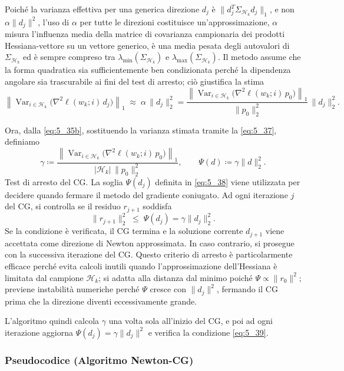 \documentclass[a4paper,12pt]{article}
\numberwithin{equation}{section}
\numberwithin{figure}{section}
\numberwithin{table}{section}
\begin{document}
Poiché la varianza effettiva per una generica direzione $d_j$ è $\|d_j^T \Sigma_{\mathcal{H}_k} d_j\|_1$, e non $\alpha\|d_j\|^2$, l'uso di $\alpha$ per tutte le direzioni costituisce un'approssimazione, $\alpha$ misura l'influenza media della matrice di covarianza campionaria dei prodotti Hessiana-vettore su un vettore generico, è una media pesata degli autovalori di $\Sigma_{\mathcal{H}_k}$ ed è sempre compreso tra $\lambda_{\min}(\Sigma_{\mathcal{H}_k})$ e $\lambda_{\max}(\Sigma_{\mathcal{H}_k})$. Il metodo assume che la forma quadratica sia sufficientemente ben condizionata perché la dipendenza angolare sia trascurabile ai fini del test di arresto; ciò giustifica la stima
\[\left\| \operatorname{Var}_{i\in\mathcal{H}_k}\bigl(\nabla^2\ell(w_k;i)\,d_j\bigr) \right\|_1
\;\approx\;
\alpha \, \|d_j\|_2^2
=
\frac{\left\| \operatorname{Var}_{i\in\mathcal{H}_k}\bigl(\nabla^2\ell(w_k;i)\,p_0\bigr) \right\|_1}{\|p_0\|_2^2} \, \|d_j\|_2^2.
\tag{5.37}\label{eq:5_37}
\]

Ora, dalla \eqref{eq:5_35b}, sostituendo la varianza stimata tramite la \eqref{eq:5_37}, definiamo
\[
\gamma \coloneqq
\frac{\left\| \operatorname{Var}_{i\in\mathcal{H}_k}\bigl(\nabla^2\ell(w_k;i)\,p_0\bigr) \right\|_1}{|\mathcal{H}_k| \, \|p_0\|_2^2},
\qquad
\Psi(d) \coloneqq \gamma \|d\|_2^2.
\tag{5.38}\label{eq:5_38}
\]
\medskip
\noindent
Test di arresto del CG.
La soglia $\Psi(d_j)$ definita in \eqref{eq:5_38} viene utilizzata per decidere quando fermare il metodo del gradiente coniugato. Ad ogni iterazione $j$ del CG, si controlla se il residuo $r_{j+1}$ soddisfa
\[
\| r_{j+1} \|_2^2 \;\le\; \Psi(d_j) = \gamma \|d_j\|_2^2.
\tag{5.39}\label{eq:5_39}
\]
Se la condizione è verificata, il CG termina e la soluzione corrente $d_{j+1}$ viene accettata come direzione di Newton approssimata. In caso contrario, si prosegue con la successiva iterazione del CG.
Questo criterio di arresto è particolarmente efficace perché evita calcoli inutili quando l'approssimazione dell'Hessiana è limitata dal campione $\mathcal{H}_k$; si adatta alla distanza dal minimo poiché $\Psi \propto \|r_0\|^2$; previene instabilità numeriche perché $\Psi$ cresce con $\|d_j\|^2$, fermando il CG prima che la direzione diventi eccessivamente grande.

L'algoritmo quindi calcola $\gamma$ una volta sola all'inizio del CG, e poi ad ogni iterazione aggiorna $\Psi(d_j) = \gamma \|d_j\|^2$ e verifica la condizione \eqref{eq:5_39}.
\medskip
\noindent
\newpage
\subsubsection{Pseudocodice (Algoritmo Newton-CG)}
\end{document}
